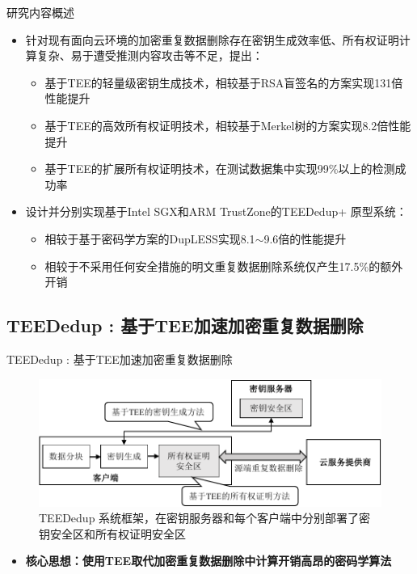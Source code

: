 \documentclass{beamer}
\newcommand{\sysnameS}{TEEDedup }
\newcommand{\prototype}{TEEDedup+ }
\begin{document}
\begin{frame}{研究内容概述}
    \begin{itemize}
        \item 针对现有面向云环境的加密重复数据删除存在密钥生成效率低、所有权证明计算复杂、易于遭受推测内容攻击等不足，提出：
              \begin{itemize}
                  \item 基于TEE的轻量级密钥生成技术，相较基于RSA盲签名的方案实现{\color{red}131倍}性能提升
                  \item 基于TEE的高效所有权证明技术，相较基于Merkel树的方案实现{\color{red}8.2倍}性能提升
                  \item 基于TEE的扩展所有权证明技术，在测试数据集中实现{\color{red}99\%}以上的检测成功率
              \end{itemize}
    \end{itemize}
    \begin{itemize}
        \item 设计并分别实现基于Intel SGX和ARM TrustZone的\prototype 原型系统：
              \begin{itemize}
                  \item 相较于基于密码学方案的DupLESS实现{\color{red}8.1$\sim$9.6倍}的性能提升
                  \item 相较于不采用任何安全措施的明文重复数据删除系统仅产生{\color{red}17.5\%}的额外开销
              \end{itemize}
    \end{itemize}
\end{frame}

\subsection{\sysnameS: 基于TEE加速加密重复数据删除}

\begin{frame}{\sysnameS: 基于TEE加速加密重复数据删除}
    \begin{figure}[!htb]
        \centering
        \includegraphics[width=\linewidth]{../pic/sgxdedup/sgxdedup-arch.pdf}
        \caption{\sysnameS 系统框架，在密钥服务器和每个客户端中分别部署了密钥安全区和所有权证明安全区}
        \label{fig:sgxdedup-overview}
    \end{figure}
    \vspace{-1em}
    \begin{itemize}
        \item  {\bf 核心思想：使用TEE取代加密重复数据删除中计算开销高昂的密码学算法}
    \end{itemize}
\end{frame}
\end{document}
